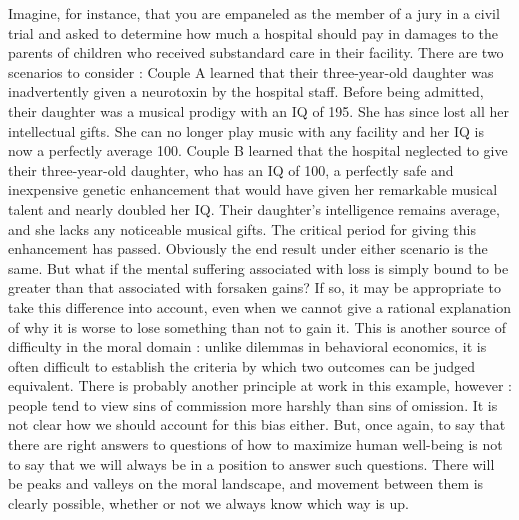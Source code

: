 \documentclass[a4paper,14pt]{extarticle}
\begin{document}
Imagine, for instance, that you are empaneled as the member of a jury in a civil trial and asked to determine how much a hospital should pay in damages to the parents of children who received substandard care in their facility.
There are two scenarios to consider :
Couple A learned that their three-year-old daughter was inadvertently given a neurotoxin by the hospital staff.
Before being admitted, their daughter was a musical prodigy with an IQ of 195.
She has since lost all her intellectual gifts.
She can no longer play music with any facility and her IQ is now a perfectly average 100.
Couple B learned that the hospital neglected to give their three-year-old daughter, who has an IQ of 100, a perfectly safe and inexpensive genetic enhancement that would have given her remarkable musical talent and nearly doubled her IQ.
Their daughter's intelligence remains average, and she lacks any noticeable musical gifts.
The critical period for giving this enhancement has passed.
Obviously the end result under either scenario is the same.
But what if the mental suffering associated with loss is simply bound to be greater than that associated with forsaken gains?
If so, it may be appropriate to take this difference into account, even when we cannot give a rational explanation of why it is worse to lose something than not to gain it.
This is another source of difficulty in the moral domain :
unlike dilemmas in behavioral economics, it is often difficult to establish the criteria by which two outcomes can be judged equivalent.
There is probably another principle at work in this example, however :
people tend to view sins of commission more harshly than sins of omission.
It is not clear how we should account for this bias either.
But, once again, to say that there are right answers to questions of how to maximize human well-being is not to say that we will always be in a position to answer such questions.
There will be peaks and valleys on the moral landscape, and movement between them is clearly possible, whether or not we always know which way is up.
\end{document}
